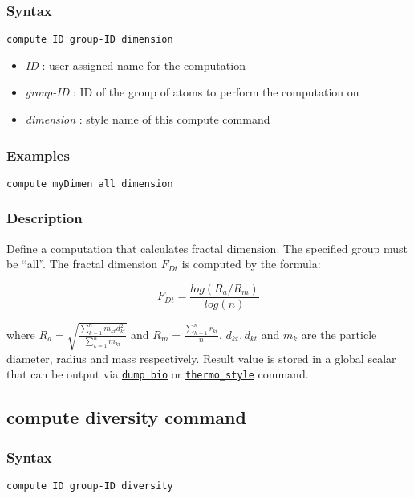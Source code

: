 \documentclass[11pt,a4paper,openright]{article}
\begin{document}
\subsubsection*{Syntax}
\begin{Verbatim}[frame=single]
compute ID group-ID dimension
\end{Verbatim}

\begin{itemize}  [nosep]
\item
	{\it ID }: user-assigned name for the computation
\item
	{\it group-ID }: ID of the group of atoms to perform the computation on
\item
	{\it dimension }: style name of this compute command
\end{itemize}

\subsubsection*{Examples}

\begin{Verbatim}[frame=single]
compute myDimen all dimension
\end{Verbatim}

\subsubsection*{Description}
Define a computation that calculates
fractal dimension. 
The specified group must be  ``all''.
The fractal dimension $F_{Dt}$
is computed by the formula:

\[ F_{Dt} = \frac{log(R_a/R_m)}{log(n)} \] 

where $R_a =  \sqrt{\frac{\sum_{k=1}^{n} m_{kt}d^2_{kt}}{\sum_{k=1}^{n} m_{kt}}}$ and 
$R_m = \frac{\sum_{k=1}^{n} r_{kt}}{n}$, $d_{kt}, d_{kt}$ and $m_{k}$ are the particle
diameter, radius and mass respectively. Result value is stored in 
a global scalar that can be output via \hyperref[dumpbio]{\tt dump bio}
or \href{http://lammps.sandia.gov/doc/thermo_style.html}{\tt thermo\_style} command.

\newpage
\subsection{compute diversity command}
\label{cdiversity}
\subsubsection*{Syntax}
\begin{Verbatim}[frame=single]
compute ID group-ID diversity
\end{Verbatim}
\end{document}
